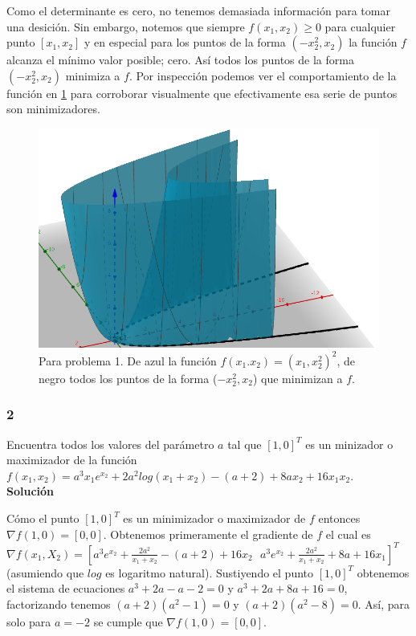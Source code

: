 \documentclass[conference]{IEEEtran}
\begin{document}
Como el determinante es cero, no tenemos demasiada información para tomar una desición.
Sin embargo, notemos que siempre $f(x_1, x_2) \ge 0$ para cualquier punto $[x_1, x_2]$
y en especial para los puntos de la forma $(-x_2^2, x_2)$ la función $f$ alcanza el mínimo
valor posible; cero. Así todos los puntos de la forma $(-x_2^2, x_2)$ minimiza a $f$.
Por inspección podemos ver el comportamiento de la función en \ref{fig1} para
corroborar visualmente que efectivamente esa serie de puntos son minimizadores.\\

\begin{figure}[htbp]
	\centerline{\includegraphics[scale=0.3]{fig1.png}}
	\caption{Para problema 1. De azul la función $f(x_1. x_2) = (x_1, x_2^2)^2$,
	de negro todos los puntos de la forma ($-x_2^2, x_2$) que minimizan a $f$.}
	\label{fig1}
\end{figure}

\subsubsection*{2}

Encuentra todos los valores del parámetro $a$ tal que $[1, 0]^T$ es un minizador o
maximizador de la función $f(x_1, x_2) = a^3x_1e^{x_2} + 2a^2log(x_1 + x_2) - (a+2) + 8ax_2 + 16x_1x_2$.
\\

\textbf{Solución}

Cómo el punto $[1, 0]^T$ es un minimizador o maximizador de $f$ entonces $\nabla f(1, 0) = [0 , 0]$.
Obtenemos primeramente el gradiente de $f$ el cual es
$\nabla f(x_1, X_2) = [a^3e^{x_2} + \frac{2a^2}{x_1 + x_2} - (a + 2) + 16x_2 \ \ \ a^3e^{x_2} + \frac{2a^2}{x_1 + x_2} + 8a + 16x_1]^T$
(asumiendo que $log$ es logaritmo natural). Sustiyendo el punto $[1, 0]^T$ obtenemos el
sistema de ecuaciones $a^3 + 2a - a - 2 = 0$ y $a^3 + 2a + 8a + 16 = 0$, factorizando
tenemos $(a+2)(a^2-1) = 0$ y $(a+2)(a^2-8) = 0$. Así, para solo para $a = -2$ se cumple
que $\nabla f(1, 0) = [0 , 0]$. \\
\end{document}
